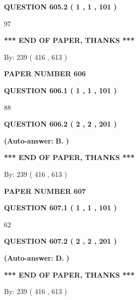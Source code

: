 \documentclass[12pt]{article}
\begin{document}
  
{\textbf{\large{QUESTION
605.2 
 ( 1 , 1 , 101 )
}}}

97
   
   
   
   
\vspace{1.0in} 
{\textbf{\large{ *** END OF PAPER, THANKS *** }}} 
   
   
\hspace{1.0in} By: 
 239 ( 416 ,  613 )
   
   
   
   
\newpage 
\setcounter{page}{ 
   606001 } 
   
   
 {\textbf{ \Large{ PAPER NUMBER  606  }}}
   
   
   
   
  
  
{\textbf{\large{QUESTION
606.1 
 ( 1 , 1 , 101 )
}}}

88
  
  
{\textbf{\large{QUESTION
606.2 
 ( 2 , 2 , 201 )
}}}
 
 
{\textbf{(Auto-answer:}}
{\textbf{\large{
B.}}}
{\textbf{)}}
 
 
   
   
   
   
\vspace{1.0in} 
{\textbf{\large{ *** END OF PAPER, THANKS *** }}} 
   
   
\hspace{1.0in} By: 
 239 ( 416 ,  613 )
   
   
   
   
\newpage 
\setcounter{page}{ 
   607001 } 
   
   
 {\textbf{ \Large{ PAPER NUMBER  607  }}}
   
   
   
   
  
  
{\textbf{\large{QUESTION
607.1 
 ( 1 , 1 , 101 )
}}}

62
  
  
{\textbf{\large{QUESTION
607.2 
 ( 2 , 2 , 201 )
}}}
 
 
{\textbf{(Auto-answer:}}
{\textbf{\large{
D.}}}
{\textbf{)}}
 
 
   
   
   
   
\vspace{1.0in} 
{\textbf{\large{ *** END OF PAPER, THANKS *** }}} 
   
   
\hspace{1.0in} By: 
 239 ( 416 ,  613 )
   
   
   
\end{document}
